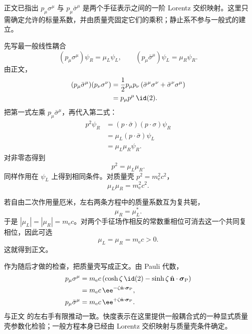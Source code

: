 \begin{derivation}

正文已指出 $p_\mu\sigma^\mu$ 与 $p_\mu\bar\sigma^\mu$ 是两个手征表示之间的一阶 Lorentz 交织映射。这里只需确定允许的标量系数，并由质量壳固定它们的乘积；静止系不参与一般式的建立。

先写最一般线性耦合
\begin{equation*}
 (p_\mu\sigma^\mu)\psi_R=\mu_L\psi_L,
 \qquad
 (p_\mu\bar\sigma^\mu)\psi_L=\mu_R\psi_R.
\end{equation*}
由正文，
\begin{align*}
 (p_\mu\bar\sigma^\mu)(p_\nu\sigma^\nu)
 &=\frac12p_\mu p_\nu
 \left(\bar\sigma^\mu\sigma^\nu+\bar\sigma^\nu\sigma^\mu\right)\\
 &=p_\mu p^\mu\,\id(2).
\end{align*}
把第一式左乘 $p_\mu\bar\sigma^\mu$，再代入第二式：
\begin{align*}
 p^2\psi_R
 &=(p\!\cdot\!\bar\sigma)(p\!\cdot\!\sigma)\psi_R\\
 &=\mu_L(p\!\cdot\!\bar\sigma)\psi_L\\
 &=\mu_L\mu_R\psi_R.
\end{align*}
对非零态得到
\begin{equation*}
 p^2=\mu_L\mu_R.
\end{equation*}
同样作用在 $\psi_L$ 上得到相同条件。对质量壳 $p^2=m_{\mathrm e}^2c^2$，
\begin{equation*}
 \mu_L\mu_R=m_{\mathrm e}^2c^2.
\end{equation*}

若自由二次作用量厄米，左右两条方程中的质量系数互为复共轭，
\begin{equation*}
 \mu_R=\mu_L^*.
\end{equation*}
于是 $|\mu_L|=|\mu_R|=m_{\mathrm e} c$。对两个手征场作相反的常数重相位可消去这一个共同复相位，因此可选
\begin{equation*}
 \mu_L=\mu_R=m_{\mathrm e} c>0.
\end{equation*}
这就得到正文。

作为随后才做的检查，把质量壳写成正文。由 Pauli 代数，
\begin{align*}
 p_\mu\sigma^\mu
 &=m_{\mathrm e} c\left(\cosh\zeta\,\id(2)
 -\sinh\zeta\,\hat{\mathbf n}\cdot\boldsymbol\sigma_{\rm P}\right)\\
 &=m_{\mathrm e} c\,\ee^{-\zeta\hat{\mathbf n}\cdot\boldsymbol\sigma_{\rm P}},\\
 p_\mu\bar\sigma^\mu
 &=m_{\mathrm e} c\,\ee^{+\zeta\hat{\mathbf n}\cdot\boldsymbol\sigma_{\rm P}}.
\end{align*}
与正文 的左右手有限推动一致。快度表示在这里提供一般耦合式的一种显式质量壳参数化检验；一般方程本身已经由 Lorentz 交织映射与质量壳条件确定。
\end{derivation}



